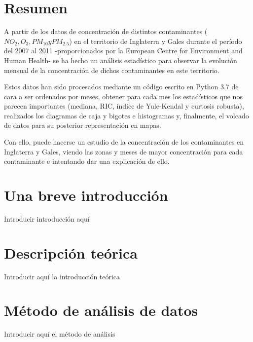 \documentclass[12pt]{article}
\begin{document}
\section*{Resumen}

\normalsize A partir de los datos de concentración de distintos contaminantes ($NO_2, O_3, PM_{10} y PM_{2.5}$) en el territorio de Inglaterra y Gales durante el período del 2007 al 2011 -proporcionados por la European Centre for Environment and Human Health- se ha hecho un análisis estadístico para observar la evolución mensual de la concentración de dichos contaminantes en este territorio.

Estos datos han sido procesados mediante un código escrito en Python 3.7 de cara a ser ordenados por meses, obtener para cada mes los estadísticos que nos parecen importantes (mediana, RIC, índice de Yule-Kendal y curtosis robusta), realizados los diagramas de caja y bigotes e histogramas y, finalmente, el volcado de datos para su posterior representación en mapas.

Con ello, puede hacerse un estudio de la concentración de los contaminantes en Inglaterra y Gales, viendo las zonas y meses de mayor concentración para cada contaminante e intentando dar una explicación de ello.

\newpage

\section*{Una breve introducción}
%

\normalsize Introducir introducción aquí

\newpage


\section{Descripción teórica}

Introducir aquí la introducción teórica

\newpage

\section{Método de análisis de datos}

Introducir aquí el método de análisis

\newpage
\end{document}
